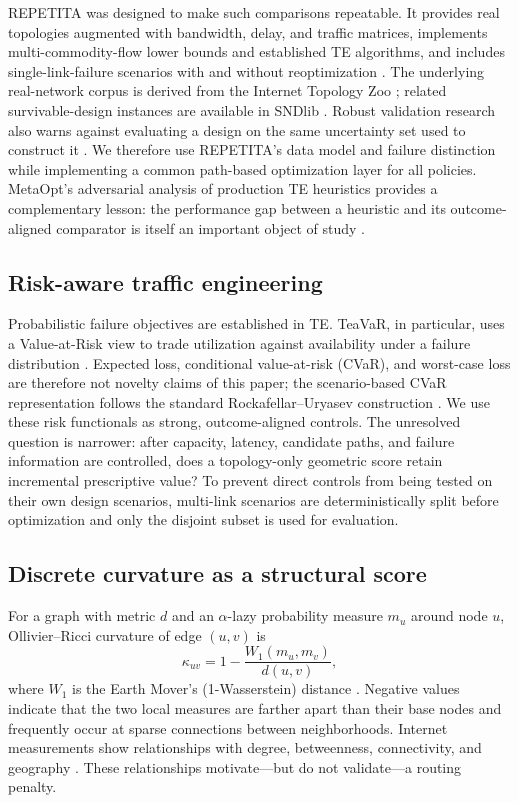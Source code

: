 \documentclass[preprint,12pt]{elsarticle}
\begin{document}
REPETITA was designed to make such comparisons repeatable. It provides real
topologies augmented with bandwidth, delay, and traffic matrices, implements
multi-commodity-flow lower bounds and established TE algorithms, and includes
single-link-failure scenarios with and without reoptimization
\cite{gay2017repetita}. The underlying real-network corpus is derived from the
Internet Topology Zoo \cite{knight2011zoo}; related survivable-design instances
are available in SNDlib \cite{orlowski2010sndlib}. Robust validation research
also warns against evaluating a design on the same uncertainty set used to
construct it \cite{chang2017validation}. We therefore use REPETITA's data model
and failure distinction while implementing a common path-based optimization
layer for all policies. MetaOpt's adversarial analysis of production TE
heuristics provides a complementary lesson: the performance gap between a
heuristic and its outcome-aligned comparator is itself an important object of
study \cite{namyar2024metaopt}.

\subsection{Risk-aware traffic engineering}

Probabilistic failure objectives are established in TE. TeaVaR, in particular,
uses a Value-at-Risk view to trade utilization against availability under a
failure distribution \cite{bogle2019teavar}. Expected loss, conditional
value-at-risk (CVaR), and worst-case loss are therefore not novelty claims of
this paper; the scenario-based CVaR representation follows the standard
Rockafellar--Uryasev construction \cite{rockafellar2000cvar}. We use these risk
functionals as strong, outcome-aligned controls. The unresolved
question is narrower: after capacity, latency, candidate paths, and failure
information are controlled, does a topology-only geometric score retain
incremental prescriptive value? To prevent direct controls from being tested
on their own design scenarios, multi-link scenarios are deterministically
split before optimization and only the disjoint subset is used for evaluation.

\subsection{Discrete curvature as a structural score}

For a graph with metric $d$ and an $\alpha$-lazy probability measure $m_u$
around node $u$, Ollivier--Ricci curvature of edge $(u,v)$ is
\begin{equation}
  \kappa_{uv}=1-\frac{W_1(m_u,m_v)}{d(u,v)},
  \label{eq:orc}
\end{equation}
where $W_1$ is the Earth Mover's (1-Wasserstein) distance
\cite{ollivier2009}. Negative values indicate that the two local measures are
farther apart than their base nodes and frequently occur at sparse connections
between neighborhoods. Internet measurements show relationships with degree,
betweenness, connectivity, and geography \cite{ni2015}. These relationships
motivate---but do not validate---a routing penalty.
\end{document}
